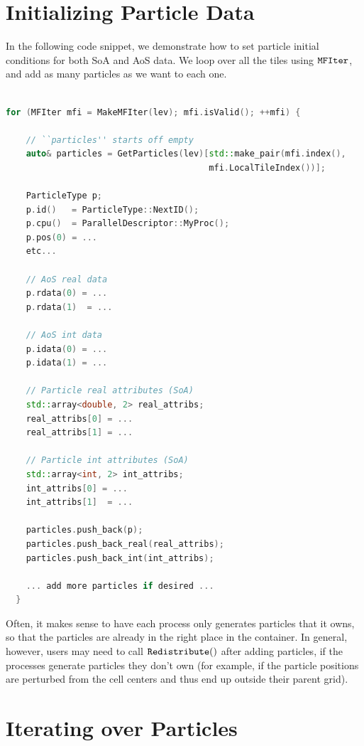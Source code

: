 \section{Initializing Particle Data}
\label{sec:Particles:Initializing}

In the following code snippet, we demonstrate how to set particle initial conditions for both SoA and AoS data. We loop over all the tiles using $\tt{MFIter}$, and add
as many particles as we want to each one.

\begin{lstlisting}[language=cpp]

for (MFIter mfi = MakeMFIter(lev); mfi.isValid(); ++mfi) {

    // ``particles'' starts off empty
    auto& particles = GetParticles(lev)[std::make_pair(mfi.index(),
                                        mfi.LocalTileIndex())];
 
    ParticleType p;
    p.id()   = ParticleType::NextID();
    p.cpu()  = ParallelDescriptor::MyProc();
    p.pos(0) = ...
    etc...

    // AoS real data
    p.rdata(0) = ...
    p.rdata(1)  = ...
         
    // AoS int data
    p.idata(0) = ...
    p.idata(1) = ...

    // Particle real attributes (SoA)
    std::array<double, 2> real_attribs;
    real_attribs[0] = ...
    real_attribs[1] = ...

    // Particle int attributes (SoA)
    std::array<int, 2> int_attribs;
    int_attribs[0] = ...
    int_attribs[1]  = ...
 
    particles.push_back(p);
    particles.push_back_real(real_attribs);
    particles.push_back_int(int_attribs);

    ... add more particles if desired ...
  }

\end{lstlisting}

Often, it makes sense to have each process only generates particles that it owns, so that the particles are already in the right place in the container. 
In general, however, users may need to call $\tt{Redistribute()}$ after adding particles, if the processes generate particles they don't own (for example,
if the particle positions are perturbed from the cell centers and thus end up outside their parent grid).

\section{Iterating over Particles}
\label{sec:Particles:Iterating}

